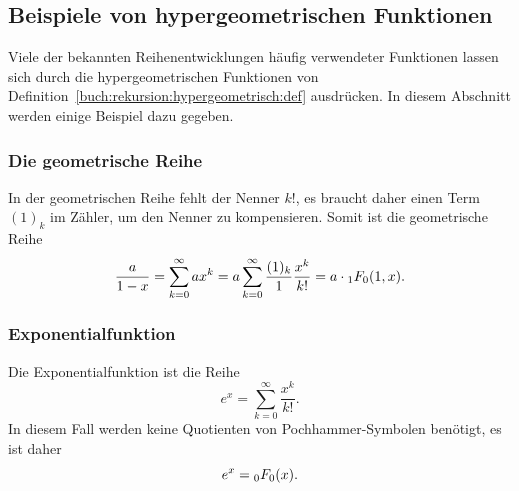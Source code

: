 %
%
\subsection{Beispiele von hypergeometrischen Funktionen
\label{buch:rekursion:hypergeometrisch:beispiele}}
Viele der bekannten Reihenentwicklungen häufig verwendeter Funktionen
lassen sich durch die hypergeometrischen Funktionen von
Definition~\ref{buch:rekursion:hypergeometrisch:def} ausdrücken.
In diesem Abschnitt werden einige Beispiel dazu gegeben.

%
%
\subsubsection{Die geometrische Reihe}
In der geometrischen Reihe fehlt der Nenner $k!$, es braucht
daher einen Term $(1)_k$ im Zähler, um den Nenner zu kompensieren.
Somit ist die geometrische Reihe
\[
\frac{a}{1-x}
=
\sum_{k=0}^\infty
ax^k
=
a\sum_{k=0}^\infty
\frac{(1)_k}{1}
\frac{x^k}{k!}
=
a\cdot\mathstrut_1F_0(1,x).
\]

%
%
\subsubsection{Exponentialfunktion}
Die Exponentialfunktion ist die Reihe
\[
e^x = \sum_{k=0}^\infty \frac{x^k}{k!}.
\]
In diesem Fall werden keine Quotienten von Pochhammer-Symbolen
benötigt, es ist daher
\[
e^x = \mathstrut_0F_0(x).
\]

%
%
